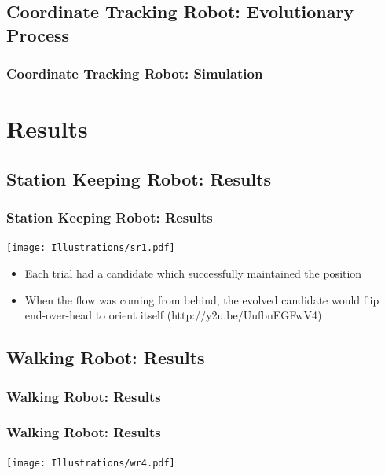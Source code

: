 \documentclass{beamer}
\begin{document}
\subsection{Coordinate Tracking Robot: Evolutionary Process}
\begin{frame}
  \frametitle{Coordinate Tracking Robot: Simulation}
\end{frame}

\section{Results}
\subsection{Station Keeping Robot: Results} %
\begin{frame}
  \frametitle{Station Keeping Robot: Results}
  \begin{center}
  \texttt{[image: Illustrations/sr1.pdf]}
       \\
    \end{center}
  \begin{itemize}
    \item Each trial had a candidate which successfully maintained the position
        \item When the flow was coming from behind, the evolved candidate would flip end-over-head to orient itself (http://y2u.be/UufbnEGFwV4)
  \end{itemize}
\end{frame}

\subsection{Walking Robot: Results}
\begin{frame}
  \frametitle{Walking Robot: Results}
\end{frame}

\begin{frame}
  \frametitle{Walking Robot: Results}

\begin{center}
 \texttt{[image: Illustrations/wr4.pdf]}
       \\
\end{center}
\end{frame}
\end{document}
